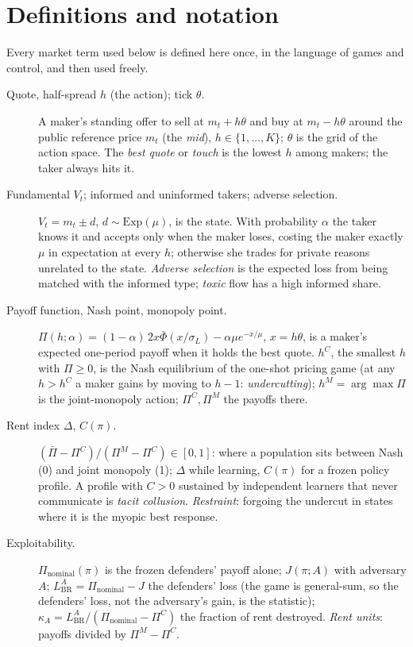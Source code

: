 \documentclass[10pt]{article}
\begin{document}
\section{Definitions and notation}\label{sec:defs}
Every market term used below is defined here once, in the language of games and control, and then used freely.
\begin{description}
\item[Quote, half-spread $h$ (the action); tick $\theta$.] A maker's standing offer to sell at $m_t+h\theta$ and buy at $m_t-h\theta$ around the public reference price $m_t$ (the \emph{mid}), $h\in\{1,\dots,K\}$; $\theta$ is the grid of the action space. The \emph{best quote} or \emph{touch} is the lowest $h$ among makers; the taker always hits it.
\item[Fundamental $V_t$; informed and uninformed takers; adverse selection.] $V_t=m_t\pm d$, $d\sim\mathrm{Exp}(\mu)$, is the state. With probability $\alpha$ the taker knows it and accepts only when the maker loses, costing the maker exactly $\mu$ in expectation at every $h$; otherwise she trades for private reasons unrelated to the state. \emph{Adverse selection} is the expected loss from being matched with the informed type; \emph{toxic} flow has a high informed share.
\item[Payoff function, Nash point, monopoly point.] $\Pi(h;\alpha)=(1-\alpha)\,2x\bar\Phi(x/\sigma_L)-\alpha\mu e^{-x/\mu}$, $x=h\theta$, is a maker's expected one-period payoff when it holds the best quote. $h^C$, the smallest $h$ with $\Pi\ge0$, is the Nash equilibrium of the one-shot pricing game (at any $h>h^C$ a maker gains by moving to $h-1$: \emph{undercutting}); $h^M=\arg\max\Pi$ is the joint-monopoly action; $\Pi^C,\Pi^M$ the payoffs there.
\item[Rent index $\Delta$, $C(\pi)$.] $(\bar\Pi-\Pi^C)/(\Pi^M-\Pi^C)\in[0,1]$: where a population sits between Nash (0) and joint monopoly (1); $\Delta$ while learning, $C(\pi)$ for a frozen policy profile. A profile with $C>0$ sustained by independent learners that never communicate is \emph{tacit collusion}. \emph{Restraint}: forgoing the undercut in states where it is the myopic best response.
\item[Exploitability.] $\Pi_{\mathrm{nominal}}(\pi)$ is the frozen defenders' payoff alone; $J(\pi;A)$ with adversary $A$; $L^A_{\mathrm{BR}}=\Pi_{\mathrm{nominal}}-J$ the defenders' loss (the game is general-sum, so the defenders' loss, not the adversary's gain, is the statistic); $\kappa_A=L^A_{\mathrm{BR}}/(\Pi_{\mathrm{nominal}}-\Pi^C)$ the fraction of rent destroyed. \emph{Rent units}: payoffs divided by $\Pi^M-\Pi^C$.

\end{description}
\end{document}
